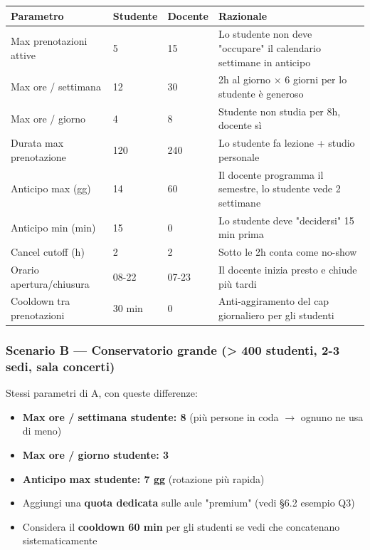 \documentclass[11pt,a4paper]{article}
\begin{document}
\begin{table}[H]
\centering
\small
\begin{tabularx}{\linewidth}{|X|X|X|X|}
\hline
\rowcolor{tableheader} Parametro & Studente & Docente & Razionale \\
\hline
Max prenotazioni attive & 5 & 15 & Lo studente non deve "occupare" il calendario settimane in anticipo \\
\hline
Max ore / settimana & 12 & 30 & 2h al giorno × 6 giorni per lo studente è generoso \\
\hline
Max ore / giorno & 4 & 8 & Studente non studia per 8h, docente sì \\
\hline
Durata max prenotazione & 120 & 240 & Lo studente fa lezione + studio personale \\
\hline
Anticipo max (gg) & 14 & 60 & Il docente programma il semestre, lo studente vede 2 settimane \\
\hline
Anticipo min (min) & 15 & 0 & Lo studente deve "decidersi" 15 min prima \\
\hline
Cancel cutoff (h) & 2 & 2 & Sotto le 2h conta come no-show \\
\hline
Orario apertura/chiusura & 08-22 & 07-23 & Il docente inizia presto e chiude più tardi \\
\hline
Cooldown tra prenotazioni & 30 min & 0 & Anti-aggiramento del cap giornaliero per gli studenti \\
\hline
\end{tabularx}
\end{table}


\subsubsection{Scenario B --- Conservatorio grande (\textgreater{} 400 studenti, 2-3 sedi, sala concerti)}


Stessi parametri di A, con queste differenze:

\begin{itemize}
  \item \textbf{Max ore / settimana studente: 8} (più persone in coda $\rightarrow$ ognuno ne usa di meno)
  \item \textbf{Max ore / giorno studente: 3}
  \item \textbf{Anticipo max studente: 7 gg} (rotazione più rapida)
  \item Aggiungi una \textbf{quota dedicata} sulle aule "premium" (vedi §6.2 esempio Q3)
  \item Considera il \textbf{cooldown 60 min} per gli studenti se vedi che concatenano sistematicamente
\end{itemize}
\end{document}
